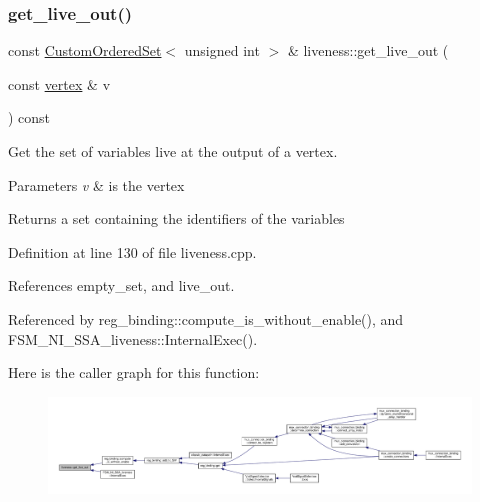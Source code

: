 \subsubsection{\texorpdfstring{get\+\_\+live\+\_\+out()}{get\_live\_out()}}
{\footnotesize\ttfamily const \hyperlink{classCustomOrderedSet}{Custom\+Ordered\+Set}$<$ unsigned int $>$ \& liveness\+::get\+\_\+live\+\_\+out (\begin{DoxyParamCaption}\item[{const \hyperlink{graph_8hpp_abefdcf0544e601805af44eca032cca14}{vertex} \&}]{v }\end{DoxyParamCaption}) const}



Get the set of variables live at the output of a vertex. 


\begin{DoxyParams}{Parameters}
{\em v} & is the vertex \\
\hline
\end{DoxyParams}
\begin{DoxyReturn}{Returns}
a set containing the identifiers of the variables 
\end{DoxyReturn}


Definition at line 130 of file liveness.\+cpp.



References empty\+\_\+set, and live\+\_\+out.



Referenced by reg\+\_\+binding\+::compute\+\_\+is\+\_\+without\+\_\+enable(), and F\+S\+M\+\_\+\+N\+I\+\_\+\+S\+S\+A\+\_\+liveness\+::\+Internal\+Exec().

Here is the caller graph for this function\+:
\nopagebreak
\begin{figure}[H]
\begin{center}
\leavevmode
\includegraphics[width=350pt]{d3/d1f/classliveness_a7d8d790a7cfe2d54832f8edcc3365407_icgraph}
\end{center}
\end{figure}
\mbox{\label{classliveness_a82ed916485e74cfa88f9ef53da286bc2}} 
